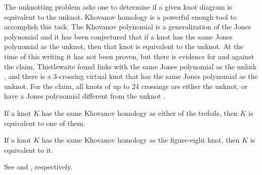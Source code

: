     The unknotting problem asks one to determine if a given knot diagram is
    equivalent to the unknot. Khovanov homology is a powerful enough tool
    to accomplish this task. The Khovanov polynomial is a generalization of
    the Jones polynomial and it has been conjectured that if a
    knot has the same Jones polynomial as the unknot, then that knot is
    equivalent to the unknot. At the time of this writing it has not been
    proven, but there is evidence for and against the claim.
    Thistlewaite found links with the same Jones polynomial as the unlink
    \cite{Thistlethwaite2001LINKSWT}, and there is a 3-crossing virtual
    knot that has the same Jones polynomial as the unknot. For the claim,
    all knots of up to 24 crossings are either the unknot, or have a
    Jones polynomial different from the unknot
    \cite{VerificationUnknotJonesConjUpTo24}.
    \begin{theorem}
        If a knot $K$ has the same Khovanov homology as either of the
        trefoils, then $K$ is equivalent to one of them.
    \end{theorem}
    \begin{theorem}
        If a knot $K$ has the same Khovanov homology as the figure-eight
        knot, then $K$ is equivalent to it.
    \end{theorem}
    See \cite{BaldwinSivekKhovanovTrefoils} and
    \cite{BaldwinDowlinKhovanovFigureEight}, respectively.
